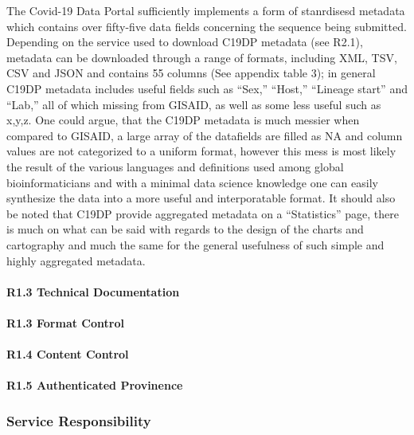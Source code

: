 \documentclass{article}
\begin{document}
The Covid-19 Data Portal sufficiently implements a form of stanrdisesd
metadata which contains over fifty-five data fields concerning the
sequence being submitted. Depending on the service used to download
C19DP metadata (see R2.1), metadata can be downloaded through a range of
formats, including XML, TSV, CSV and JSON and contains 55 columns (See
appendix table 3); in general C19DP metadata includes useful fields such
as ``Sex,'' ``Host,'' ``Lineage start'' and ``Lab,'' all of which
missing from GISAID, as well as some less useful such as x,y,z. One
could argue, that the C19DP metadata is much messier when compared to
GISAID, a large array of the datafields are filled as NA and column
values are not categorized to a uniform format, however this mess is
most likely the result of the various languages and definitions used
among global bioinformaticians and with a minimal data science knowledge
one can easily synthesize the data into a more useful and interporatable
format. It should also be noted that C19DP provide aggregated metadata
on a ``Statistics'' page, there is much on what can be said with regards
to the design of the charts and cartography and much the same for the
general usefulness of such simple and highly aggregated metadata.

\hypertarget{r1.3-technical-documentation}{%
\paragraph{R1.3 Technical
Documentation}\label{r1.3-technical-documentation}}

\hypertarget{r1.3-format-control-1}{%
\paragraph{R1.3 Format Control}\label{r1.3-format-control-1}}

\hypertarget{r1.4-content-control-1}{%
\paragraph{R1.4 Content Control}\label{r1.4-content-control-1}}

\hypertarget{r1.5-authenticated-provinence-1}{%
\paragraph{R1.5 Authenticated
Provinence}\label{r1.5-authenticated-provinence-1}}

\hypertarget{service-responsibility-2}{%
\subsubsection{Service Responsibility}\label{service-responsibility-2}}
\end{document}
